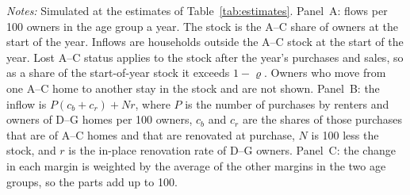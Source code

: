 \begin{table}[!tp]
  \centering
  \caption[Flows into and out of efficient ownership, by age]{{Flows
  into and out of efficient ownership, by age}}\label{tab:flows-accounting}
  \begin{threeparttable}
    \small
    \begin{tablenotes}[flushleft]\footnotesize
      \item {\textit{Notes:} Simulated at the estimates of
      Table~\ref{tab:estimates}. Panel~A: flows per 100
      owners in the age group a year. The stock is the A--C share of owners
      at the start of the year. Inflows are households outside the A--C stock
      at the start of the year. Lost A--C status applies to the stock after
      the year's purchases and sales, so as a share of the start-of-year
      stock it exceeds $1-\varrho$. Owners who move from one A--C home to
      another stay in the stock and are not shown. Panel~B: the inflow is
      $P(c_b+c_r)+N r$, where $P$ is the number of purchases by renters and
      owners of D--G homes per 100 owners, $c_b$ and $c_r$ are the shares of
      those purchases that are of A--C homes and that are renovated at
      purchase, $N$ is 100 less the stock, and $r$ is the in-place
      renovation rate of D--G owners. Panel~C: the change in each margin is
      weighted by the average of the other margins in the two age groups, so
      the parts add up to 100.}
    \end{tablenotes}
  \end{threeparttable}
\end{table}

